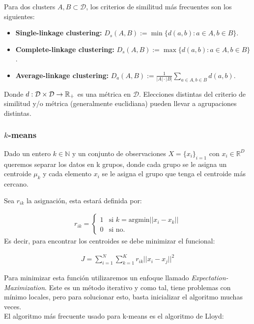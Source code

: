Para dos clusters $A,B\subset\mathcal{D}$, los criterios de similitud más frecuentes son los siguientes:

\begin{itemize}
	\item \textbf{Single-linkage clustering:} $D_s(A,B):=\min\{d(a,b):a\in A, b\in B\}$.
	\item \textbf{Complete-linkage clustering:} $D_s(A,B):=\max\{d(a,b):a\in A, b\in B\}$.
	\item \textbf{Average-linkage clustering:} $D_a(A,B):=\frac{1}{|A|\cdot|B|}\sum_{a\in A, b\in B} d(a,b)$.
\end{itemize}

Donde $d:\mathcal{D}\times \mathcal{D}\to \mathbb{R}_+$ es una métrica en $\mathcal{D}$. Elecciones distintas del criterio de similitud y/o métrica (generalmente euclidiana) pueden llevar a agrupaciones distintas.

\subsubsection{$k$-means}
Dado un entero $k \in \mathbb{N}$ y un conjunto de observaciones $X = \{x_i\}_{i=1}$ con $x_i\in \mathbb{R}^D$ queremos separar los datos en k grupos, donde cada grupo se le asigna un centroide $\mu_k$ y cada elemento $x_i$ se le asigna el grupo que tenga el centroide más cercano.

Sea $r_{ik}$ la asignación, esta estará definida por:

\begin{align}
r_{ik} = \begin{cases}
1 & \text{si } k = \text{argmin}||x_i-x_k||\\
0 & \text{si no.}
\end{cases}
\end{align}
Es decir, para encontrar los centroides se debe minimizar el funcional:

\begin{align}
J = \sum_{i=1}^N \sum_{k=1}^K r_{ik} ||x_i-x_j||^2
\end{align}

Para minimizar esta función utilizaremos un enfoque llamado \emph{Expectation-Maximization}. Este es un método iterativo y como tal, tiene problemas con mínimo locales, pero para solucionar esto, basta inicializar el algoritmo muchas veces.\\

El algoritmo más frecuente usado para k-means es el algoritmo de Lloyd:

